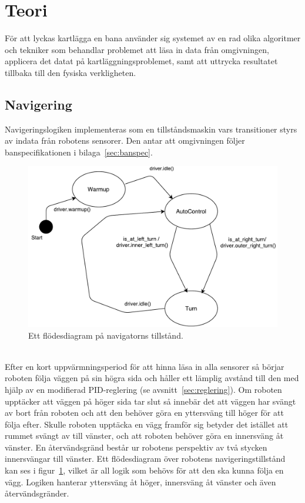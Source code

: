 \documentclass{article}
\begin{document}
\clearpage
\section{Teori}
För att lyckas kartlägga en bana använder sig systemet av en rad olika algoritmer och tekniker som behandlar problemet att läsa in data från omgivningen, applicera det datat på kartläggningsproblemet, samt att uttrycka resultatet tillbaka till den fysiska verkligheten.

\subsection{Navigering}
\label{sec:navigering}
Navigeringslogiken implementeras som en tillståndsmaskin vars transitioner styrs av indata från robotens sensorer. Den antar att omgivningen följer banspecifikationen i bilaga~\ref{sec:banspec}.

\begin{figure}[H]
\centering
\includegraphics[scale=0.4]{navigator_flowchart}
\caption{Ett flödesdiagram på navigatorns tillstånd.}
\label{fig:navigator_flowchart}
\end{figure}
\ \\
Efter en kort uppvärmningsperiod för att hinna läsa in alla sensorer så börjar roboten följa väggen på sin högra sida och håller ett lämplig avstånd till den med hjälp av en modifierad PID-reglering (se avsnitt~\ref{sec:reglering}). Om roboten upptäcker att väggen på höger sida tar slut så innebär det att väggen har svängt av bort från roboten och att den behöver göra en yttersväng till höger för att följa efter. Skulle roboten upptäcka en vägg framför sig betyder det istället att rummet svängt av till vänster, och att roboten behöver göra en innersväng åt vänster. En återvändsgränd består ur robotens perspektiv av två stycken innersvängar till vänster. Ett flödesdiagram över robotens navigeringstillstånd kan ses i figur~\ref{fig:navigator_flowchart}, vilket är all logik som behövs för att den ska kunna följa en vägg. Logiken hanterar yttersväng åt höger, innersväng åt vänster och även återvändsgränder.
\end{document}
